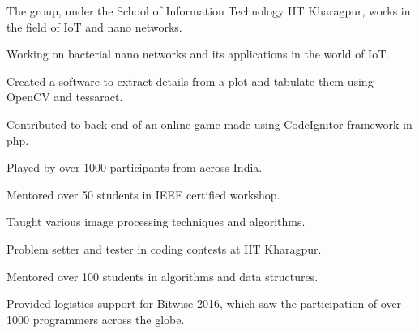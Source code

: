 \documentclass[a4paper]{deedy-resume} %
\begin{document}
\begin{minipage}[t]{0.66\textwidth}
  \sectionspace
  
  \runsubsection{}
  \begin{tightitemize}
  \item The group, under the School of Information Technology IIT Kharagpur, works in the field of IoT and nano networks.
  \item	Working on bacterial nano networks and its applications in the world of IoT.
  \end{tightitemize}

  \sectionspace

  \runsubsection{}
  \begin{tightitemize}
  \item Created a software to extract details from a plot and tabulate them using OpenCV and tessaract.
  \end{tightitemize}

  \sectionspace

  \runsubsection{}
  \begin{tightitemize}
  \item Contributed to back end of an online game made using CodeIgnitor framework in php.
  \item Played by over 1000 participants from across India.
  \end{tightitemize}


  \sectionspace

  \runsubsection{}
  \begin{tightitemize}
  \item Mentored over 50 students in IEEE certified workshop.
  \item Taught various image processing techniques and algorithms.
  \end{tightitemize}

  \sectionspace

  \runsubsection{}
  \begin{tightitemize}
  \item Problem setter and tester in coding contests at IIT Kharagpur.
  \item Mentored over 100 students in algorithms and data structures.
  \item Provided logistics support for Bitwise 2016, which saw the participation of over 1000 programmers across the globe.
  \end{tightitemize}
  

\end{minipage}
\end{document}
